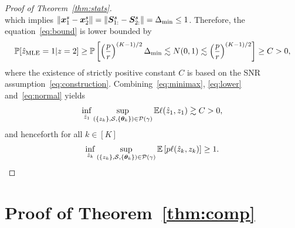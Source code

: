 \documentclass[lettersize,journal]{IEEEtran}
\theoremstyle{definition}
\theoremstyle{definition}
\begin{document}
\begin{proof}[Proof of Theorem~\ref{thm:stats}]
\begin{equation}
\end{equation}
which implies $\lVert\bm x^s_1-\bm x^s_2\rVert = \lVert\bm S_{1:}^s-\bm S_{2:}^s\rVert = \Delta_{\min} \leq 1$. Therefore, the equation~\eqref{eq:bound} is lower bounded by
\begin{equation}\label{eq:normal}
\bbP[\hat z_{\text{MLE}}=1|z=2] \geq \bbP\left[ \left({p\over r}\right)^{(K-1)/2}\Delta_{\min}\lesssim N(0,1)\lesssim  \left({p\over r}\right)^{(K-1)/2} \right]\geq C>0,
\end{equation}
 where the existence of strictly positive constant $C$ is based on the SNR assumption~\eqref{eq:construction}. Combining~\eqref{eq:minimax}, \eqref{eq:lower} and~\eqref{eq:normal} yields
\[
\inf_{\hat z_1}\sup_{(\{z_k\},\mathcal{S},\{\boldsymbol{\theta}_k\})\in \mathcal{P}(\gamma)}\mathbb{E}\ell(\hat z_1, z_1)\gtrsim C>0, 
\]
and henceforth for all $k \in [K]$
\[
\inf_{\hat z_k}\sup_{(\{z_k\},\mathcal{S},\{\boldsymbol{\theta}_k\})\in \mathcal{P}(\gamma)}\mathbb{E} \left[p\ell(\hat z_k, z_k)\right]\geq 1.
\]

\end{proof}



\section*{Proof of Theorem~\ref{thm:comp}}
\end{document}
